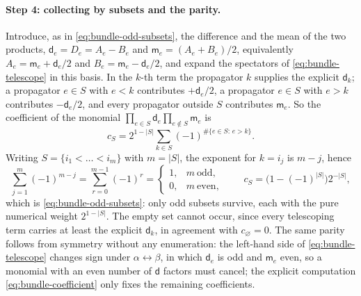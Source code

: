 \documentclass[11pt,a4paper]{article}
\numberwithin{table}{section}
\begin{document}
\paragraph{Step 4: collecting by subsets and the parity.}
Introduce, as in \eqref{eq:bundle-odd-subsets}, the difference and the mean of the two
products, $\mathsf d_e=D_e=A_e-B_e$ and $\mathsf m_e=(A_e+B_e)/2$, equivalently
$A_e=\mathsf m_e+\mathsf d_e/2$ and $B_e=\mathsf m_e-\mathsf d_e/2$, and expand the spectators of
\eqref{eq:bundle-telescope} in this basis. In the $k$-th term the propagator $k$ supplies the explicit
$\mathsf d_k$; a propagator $e\in S$ with $e<k$ contributes $+\mathsf d_e/2$, a propagator $e\in S$ with $e>k$
contributes $-\mathsf d_e/2$, and every propagator outside $S$ contributes $\mathsf m_e$. So the
coefficient of the monomial $\prod_{e\in S}\mathsf d_e\prod_{e\notin S}\mathsf m_e$ is
\begin{equation}
  c_S = 2^{1-|S|}\sum_{k\in S}(-1)^{\#\{e\in S:\,e>k\}} .
  \label{eq:bundle-coefficient}
\end{equation}
Writing $S=\{i_1<\dots<i_m\}$ with $m=|S|$, the exponent for $k=i_j$ is $m-j$, hence
\begin{equation}
  \sum_{j=1}^{m}(-1)^{m-j}=\sum_{r=0}^{m-1}(-1)^{r}
  =\begin{cases}1,&m\ \text{odd},\\ 0,&m\ \text{even},\end{cases}
  \qquad
  c_S=\bigl(1-(-1)^{|S|}\bigr)2^{-|S|},
  \label{eq:bundle-parity}
\end{equation}
which is \eqref{eq:bundle-odd-subsets}: only odd subsets survive, each with the pure numerical
weight $2^{1-|S|}$. The empty set cannot occur, since every telescoping term carries at least the
explicit $\mathsf d_k$, in agreement with $c_\varnothing=0$. The same parity follows from symmetry
without any enumeration: the left-hand side of \eqref{eq:bundle-telescope} changes sign under
$\alpha\leftrightarrow\beta$, in which $\mathsf d_e$ is odd and $\mathsf m_e$ even, so a monomial
with an even number of $\mathsf d$ factors must cancel; the explicit computation
\eqref{eq:bundle-coefficient} only fixes the remaining coefficients.
\end{document}

